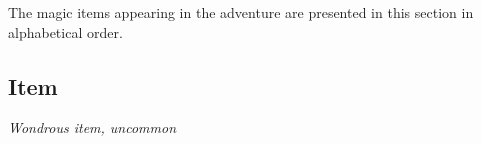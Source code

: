 \documentclass[module]{subfiles}
\begin{document}
\selectfont
\clearpage


The magic items appearing in the adventure are presented in this section in alphabetical order.\\

\subsection{Item}
\textit{Wondrous item, uncommon}\\

\lipsum[1]
\end{document}
